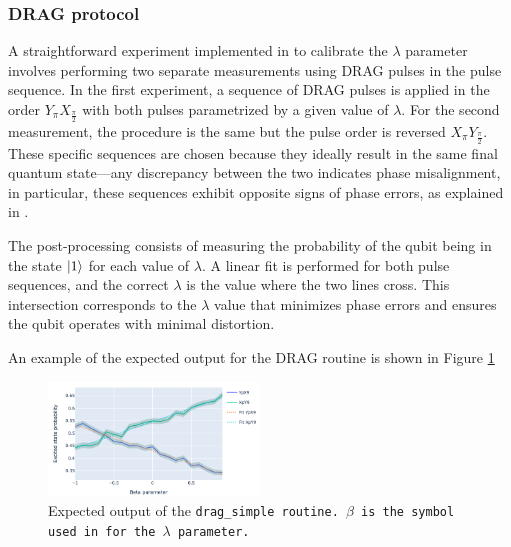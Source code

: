 \subsubsection{DRAG protocol}
A straightforward experiment implemented in \Qibocal to calibrate the $\lambda$ parameter involves performing two separate measurements using DRAG pulses in the pulse sequence.
In the first experiment, a sequence of DRAG pulses is applied in the order $Y_{\pi}$$X_{\frac{\pi}{2}}$ with both pulses parametrized by a given value of $\lambda$. 
For the second measurement, the procedure is the same but the pulse order is reversed $X_{\pi}$$Y_{\frac{\pi}{2}}$.
These specific sequences are chosen because they ideally result in the same final quantum state—any discrepancy between the two indicates phase misalignment, in particular, these sequences exhibit opposite signs of phase errors, as explained in \cite{reed2013entanglementquantumerrorcorrection}. 

The post-processing consists of measuring the probability of the qubit being in the state $\ket{1}$ for each value of $\lambda$. 
A linear fit is performed for both pulse sequences, and the correct $\lambda$ is the value where the two lines cross. 
This intersection corresponds to the $\lambda$ value that minimizes phase errors and ensures the qubit operates with minimal distortion.

An example of the expected output for the DRAG routine is shown in Figure \ref{fig:drag}
\begin{figure}[h!]
    \centering
    \includegraphics[width=0.5\textwidth]{figures/png/drag_simple.png}
    \caption{Expected output of the \tt{drag\_simple} routine. $\beta$ is the symbol used in \Qibocal for the $\lambda$ parameter.}
    \label{fig:drag}
\end{figure}

